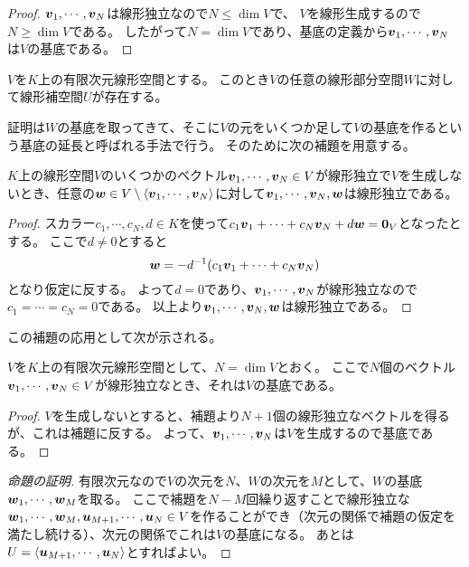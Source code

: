 \begin{proof}
$\vb*{v}_1, \cdots, \vb*{v}_N$は線形独立なので$N \le \dim V$で、
$V$を線形生成するので$N \ge \dim V$である。
したがって$N = \dim V$であり、基底の定義から$\vb*{v}_1, \cdots, \vb*{v}_N$は$V$の基底である。
\end{proof}

\begin{proposition}[線形補空間]
\label{t:complement}
$V$を$K$上の有限次元線形空間とする。
このとき$V$の任意の線形部分空間$W$に対して線形補空間$U$が存在する。
\end{proposition}

証明は$W$の基底を取ってきて、そこに$V$の元をいくつか足して$V$の基底を作るという基底の延長と呼ばれる手法で行う。
そのために次の補題を用意する。

\begin{lemma}
$K$上の線形空間$V$のいくつかのベクトル$\vb*{v}_1, \cdots, \vb*{v}_N \in V$が線形独立で$V$を生成しないとき、任意の$\vb*{w} \in V\setminus\langle \vb*{v}_1, \cdots, \vb*{v}_N \rangle$に対して$\vb*{v}_1, \cdots, \vb*{v}_N, \vb*{w}$は線形独立である。
\end{lemma}

\begin{proof}
スカラー$c_1, \cdots, c_N, d \in K$を使って$c_1\vb*{v}_1+\cdots+c_N\vb*{v}_N+d\vb*{w} = \vb*{0}_V$となったとする。
ここで$d \ne 0$とすると
$$
\vb*{w} = -d^{-1}(c_1\vb*{v}_1+\cdots+c_N\vb*{v}_N)
$$
となり仮定に反する。
よって$d = 0$であり、$\vb*{v}_1, \cdots, \vb*{v}_N$が線形独立なので$c_1 = \cdots = c_N = 0$である。
以上より$\vb*{v}_1, \cdots, \vb*{v}_N, \vb*{w}$は線形独立である。
\end{proof}

この補題の応用として次が示される。

\begin{proposition}
$V$を$K$上の有限次元線形空間として、$N = \dim V$とおく。
ここで$N$個のベクトル$\vb*{v}_1, \cdots, \vb*{v}_N \in V$が線形独立なとき、それは$V$の基底である。
\end{proposition}

\begin{proof}
$V$を生成しないとすると、補題より$N+1$個の線形独立なベクトルを得るが、これは補題に反する。
よって、$\vb*{v}_1, \cdots, \vb*{v}_N$は$V$を生成するので基底である。
\end{proof}

\begin{proof}[命題の証明]
有限次元なので$V$の次元を$N$、$W$の次元を$M$として、$W$の基底$\vb*{w}_1, \cdots, \vb*{w}_M$を取る。
ここで補題を$N-M$回繰り返すことで線形独立な$\vb*{w}_1, \cdots, \vb*{w}_M, \vb*{u}_{M+1}, \cdots, \vb*{u}_N \in V$を作ることができ（次元の関係で補題の仮定を満たし続ける）、次元の関係でこれは$V$の基底になる。
あとは$U = \langle \vb*{u}_{M+1}, \cdots, \vb*{u}_N \rangle$とすればよい。
\end{proof}

